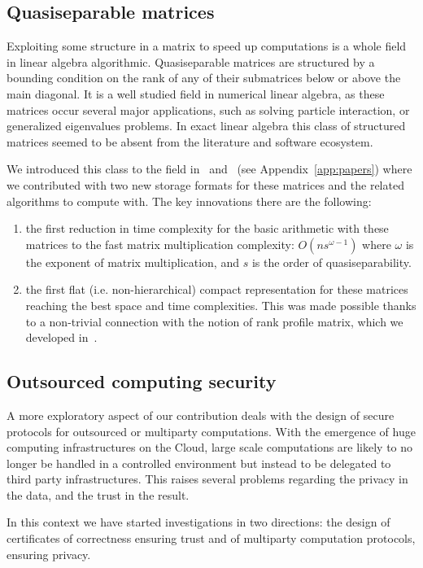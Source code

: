\documentclass{deliverablereport}
\begin{document}
\subsection{Quasiseparable matrices}

Exploiting some structure in a matrix to speed up computations is a whole field
in linear algebra algorithmic. Quasiseparable matrices are  structured by a
bounding condition on the rank of any of their submatrices below or above
the main diagonal. It is a well studied field in numerical linear algebra, as
these matrices occur several major applications, such as solving particle
interaction, or generalized eigenvalues problems.
In exact linear algebra this class of structured matrices seemed to be absent
from the literature and software ecosystem.

We introduced this class to the field in~\cite{Per16} and~\cite{PeSt18} (see Appendix~\ref{app:papers}) where we
contributed with two new storage formats for these matrices and the related algorithms
to compute with. The key innovations there are the following:
\begin{enumerate}
\item the first reduction in time complexity for the basic arithmetic with these
  matrices to the fast matrix multiplication complexity: $O(ns^{\omega-1})$
  where $\omega$ is the exponent of matrix multiplication, and $s$ is the order
  of quasiseparability.
\item the first flat (i.e. non-hierarchical) compact representation for these
  matrices reaching the best space and time complexities. This was made possible
  thanks to a non-trivial connection with the notion of rank profile matrix,
  which we developed in~\cite{DPS17}.
\end{enumerate}


\subsection{Outsourced computing security}

A more exploratory aspect of our contribution deals with the design of secure
protocols for outsourced or multiparty computations.
With the emergence of huge computing infrastructures on the Cloud, large scale
computations are likely to no longer be handled in a controlled environment but
instead to be delegated to third party infrastructures. This raises several
problems regarding the privacy in the data, and the trust in the result.

In this context we have started investigations in two directions: the design of
certificates of correctness ensuring trust and of multiparty computation
protocols, ensuring privacy.
\end{document}
